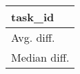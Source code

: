 \begin{tabular}{l}
\toprule
task\_id \\
\midrule
Avg. diff. \\
Median diff. \\
\bottomrule
\end{tabular}
